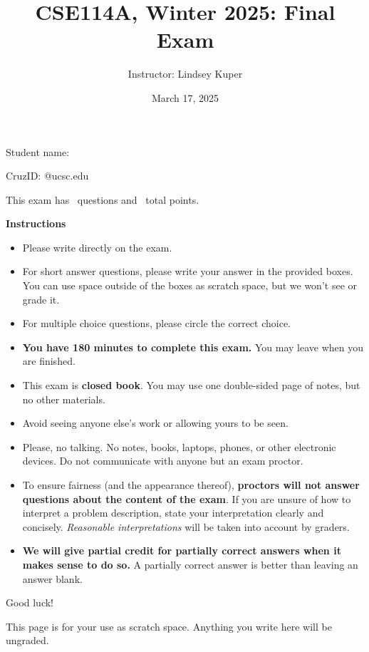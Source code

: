 \documentclass[addpoints]{exam}
\title{CSE114A, Winter 2025: Final Exam}
\author{Instructor: Lindsey Kuper}
\date{March 17, 2025}
\begin{document}
\maketitle

\begin{coverpages}

\bigskip  

\noindent Student name: \hrulefill

\bigskip
\bigskip

\noindent CruzID: \hrulefill @ucsc.edu

\bigskip
\bigskip

\noindent This exam has \numquestions~questions and \numpoints~total points.

\bigskip
\bigskip

\noindent \textbf{Instructions}

\begin{itemize}
\item Please write directly on the exam.
\item For short answer questions, please write your answer in the provided boxes.  You can use space outside of the boxes as scratch space, but we won't see or grade it.
\item For multiple choice questions, please circle the correct choice.
\item \textbf{You have 180 minutes to complete this exam.} You may leave when you are finished.
\item This exam is \textbf{closed book}.  You may use one double-sided page of notes, but no other materials.
\item Avoid seeing anyone else's work or allowing yours to be seen.
\item Please, no talking.  No notes, books, laptops, phones, or other electronic devices. Do not communicate with anyone but an exam proctor.
\item To ensure fairness (and the appearance thereof),
  \textbf{proctors will not answer questions about the content of the exam}. If you are unsure 
  of how to interpret a problem description, state your interpretation clearly and concisely. 
  \textit{Reasonable interpretations} will be taken into account by graders.
\item \textbf{We will give partial credit for partially correct answers when it makes sense to do so.} A partially correct answer is better than leaving an answer blank.
\end{itemize}

\bigskip

\noindent Good luck!

\newpage

This page is for your use as scratch space. Anything you write here will be ungraded.

\newpage

\end{coverpages}
\end{document}
